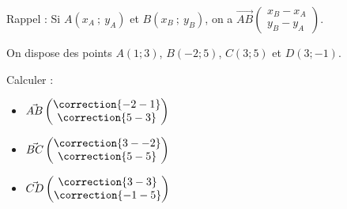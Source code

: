 \documentclass{automatisme}
\begin{document}
\begin{frame}
	\begin{tcolorbox}
		Rappel : Si $A(x_A\ ;\ y_A)$ et $B(x_B\ ;\ y_B)$, on a $\vec{AB}\begin{pmatrix} x_B - x_A \\ y_B - y_A \end{pmatrix}$.
	\end{tcolorbox}

	On dispose des points $A(1 ; 3)$, $B(-2 ; 5)$, $C(3 ; 5)$ et $D(3 ; -1)$.

	Calculer :

	\begin{itemize}
		\item $\vec{AB}\begin{pmatrix}\correction{-2 - 1} \\ \correction{5 - 3}\end{pmatrix}$
		\item $\vec{BC}\begin{pmatrix}\correction{3 - -2} \\ \correction{5 - 5}\end{pmatrix}$
		\item $\vec{CD}\begin{pmatrix}\correction{3 - 3} \\ \correction{-1 - 5}\end{pmatrix}$
	\end{itemize}
\end{frame}
\end{document}
